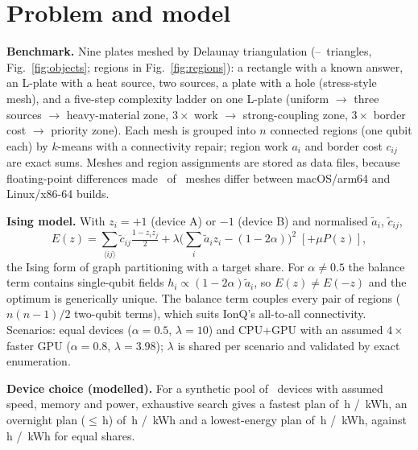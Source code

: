 \documentclass[10pt,twocolumn]{article}
\begin{document}
\section{Problem and model}
\textbf{Benchmark.} Nine plates meshed by Delaunay triangulation (\TriMin--\TriMax\ triangles, Fig.~\ref{fig:objects}; regions in Fig.~\ref{fig:regions}): a rectangle with a known answer, an L-plate with a heat source, two sources, a plate with a hole (stress-style mesh), and a five-step complexity ladder on one L-plate (uniform $\to$ three sources $\to$ heavy-material zone, $3\times$ work $\to$ strong-coupling zone, $3\times$ border cost $\to$ priority zone). Each mesh is grouped into $n$ connected regions (one qubit each) by $k$-means with a connectivity repair; region work $a_i$ and border cost $c_{ij}$ are exact sums. Meshes and region assignments are stored as data files, because floating-point differences made \MeshDiffer\ of \MeshTotal\ meshes differ between macOS/arm64 and Linux/x86-64 builds.

\textbf{Ising model.} With $z_i{=}{+}1$ (device A) or ${-}1$ (device B) and normalised $\tilde a_i$, $\tilde c_{ij}$,
\begin{equation*}
E(z)=\sum_{\langle ij\rangle}\tilde c_{ij}\tfrac{1-z_iz_j}{2}+\lambda\Big(\sum_i\tilde a_iz_i-(1-2\alpha)\Big)^{2}\;[+\mu P(z)],
\end{equation*}
the Ising form of graph partitioning \cite{lucas2014} with a target share. For $\alpha{\neq}0.5$ the balance term contains single-qubit fields $h_i\propto(1-2\alpha)\tilde a_i$, so $E(z)\neq E(-z)$ and the optimum is generically unique. The balance term couples every pair of regions ($n(n{-}1)/2$ two-qubit terms), which suits IonQ's all-to-all connectivity. Scenarios: equal devices ($\alpha{=}0.5$, $\lambda{=}10$) and CPU+GPU with an assumed $4\times$ faster GPU ($\alpha{=}0.8$, $\lambda{=}3.98$); $\lambda$ is shared per scenario and validated by exact enumeration.

\textbf{Device choice (modelled).} For a synthetic pool of \PoolDevices\ devices with assumed speed, memory and power, exhaustive search gives a fastest plan of \PoolFastTime\,h / \PoolFastEnergy\,kWh, an overnight plan ($\le$\PoolNightLimit\,h) of \PoolNightTime\,h / \PoolNightEnergy\,kWh and a lowest-energy plan of \PoolEcoTime\,h / \PoolEcoEnergy\,kWh, against \PoolNaiveTime\,h / \PoolNaiveEnergy\,kWh for equal shares.
\end{document}
